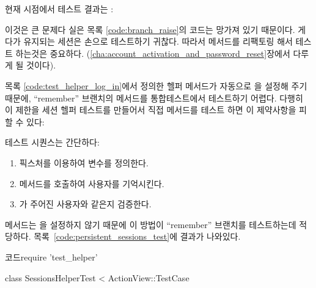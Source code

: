 {{\noindent 현재 시점에서 테스트 결과는 : 


\noindent 이것은 큰 문제다 실은 목록 \ref{code:branch_raise}의 코드는 망가져 있기 때문이다. 게다가 유지되는 세션은 손으로 테스트하기 귀찮다. 따라서  메서드를 리팩토링 해서 테스트 하는것은 중요하다. (\ref{cha:account_activation_and_password_reset}장에서 다루게 될 것이다). 

목록 \ref{code:test_helper_log_in}에서 정의한  헬퍼 메서드가 자동으로 을 설정해 주기 때문에,  ``remember'' 브랜치의  메서드를 통합테스트에서 테스트하기 어렵다. 다행히 이 제한을 세션 헬퍼 테스트를 만들어서 직접  메서드를 테스트 하면 이 제약사항을 피할 수 있다: 


\noindent 테스트 시퀀스는 간단하다: 

\begin{enumerate} \item 픽스처를 이용하여  변수를 정의한다. \item {} 메서드를 호출하여 사용자를 기억시킨다. \item {}가 주어진 사용자와 같은지 검증한다. \end{enumerate} 

\noindent {} 메서드는 을 설정하지 않기 때문에 이 방법이 ``remember'' 브랜치를 테스트하는데 적당하다. 목록~\ref{code:persistent_sessions_test}에 결과가 나와있다. 

\begin{codelisting} \label{code:persistent_sessions_test}  

\begin{code} 코드require 'test_helper' 

class SessionsHelperTest < ActionView::TestCase 


\end{code}
\end{codelisting}}}
